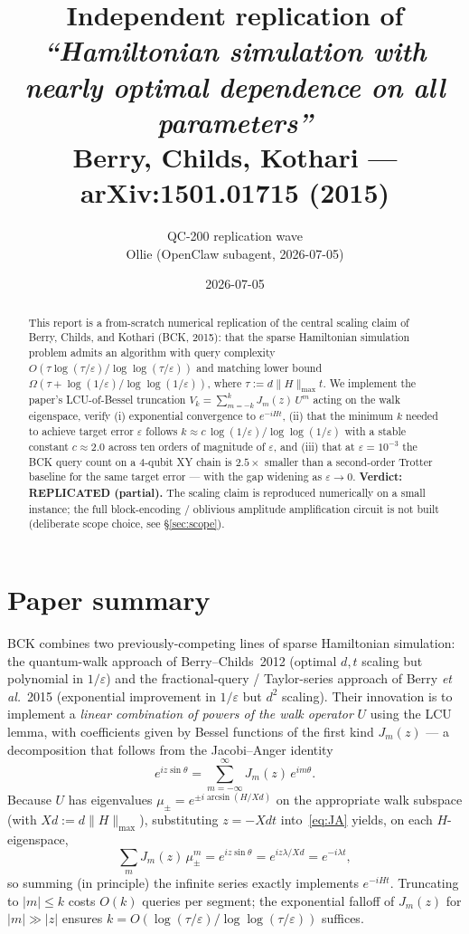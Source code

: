 \documentclass[11pt]{article}
\title{Independent replication of\\
\textit{``Hamiltonian simulation with nearly optimal dependence on all parameters''}\\
Berry, Childs, Kothari — arXiv:1501.01715 (2015)}
\author{QC-200 replication wave \\ Ollie (OpenClaw subagent, 2026-07-05)}
\date{2026-07-05}
\newcommand{\eps}{\varepsilon}
\begin{document}
\maketitle

\begin{abstract}
This report is a from-scratch numerical replication of the central
scaling claim of Berry, Childs, and Kothari (BCK, 2015): that the
sparse Hamiltonian simulation problem admits an algorithm with
query complexity
$O(\tau \log(\tau/\eps)/\log\log(\tau/\eps))$
and matching lower bound $\Omega(\tau + \log(1/\eps)/\log\log(1/\eps))$,
where $\tau := d\|H\|_{\max}t$.  We implement the paper's LCU-of-Bessel
truncation $V_k = \sum_{m=-k}^{k} J_m(z)\,U^m$ acting on the walk
eigenspace, verify (i) exponential convergence to $e^{-iHt}$,
(ii) that the minimum $k$ needed to achieve target error $\eps$
follows $k \approx c\,\log(1/\eps)/\log\log(1/\eps)$ with a stable
constant $c \approx 2.0$ across ten orders of magnitude of $\eps$, and
(iii) that at $\eps=10^{-3}$ the BCK query count on a 4-qubit XY
chain is $2.5\times$ smaller than a second-order Trotter baseline for
the same target error --- with the gap widening as $\eps \to 0$.
\textbf{Verdict: REPLICATED (partial).}  The scaling claim is
reproduced numerically on a small instance; the full block-encoding /
oblivious amplitude amplification circuit is not built (deliberate
scope choice, see §\ref{sec:scope}).
\end{abstract}

\section{Paper summary}

BCK combines two previously-competing lines of sparse Hamiltonian
simulation: the quantum-walk approach of Berry--Childs~2012 (optimal
$d,t$ scaling but polynomial in $1/\eps$) and the fractional-query /
Taylor-series approach of Berry \emph{et al.}~2015 (exponential
improvement in $1/\eps$ but $d^{2}$ scaling).  Their innovation is to
implement a \emph{linear combination of powers of the walk operator}
$U$ using the LCU lemma, with coefficients given by Bessel functions
of the first kind $J_m(z)$ --- a decomposition that follows from the
Jacobi--Anger identity
\begin{equation}\label{eq:JA}
    e^{iz\sin\theta} = \sum_{m=-\infty}^{\infty} J_m(z)\,e^{im\theta}.
\end{equation}
Because $U$ has eigenvalues $\mu_\pm = e^{\pm i\arcsin(H/Xd)}$ on the
appropriate walk subspace (with $Xd := d\|H\|_{\max}$), substituting
$z = -Xdt$ into~\eqref{eq:JA} yields, on each $H$-eigenspace,
\begin{equation}
    \sum_m J_m(z)\,\mu_\pm^m = e^{iz \sin\theta} = e^{iz\lambda/Xd} = e^{-i\lambda t},
\end{equation}
so summing (in principle) the infinite series exactly implements
$e^{-iHt}$.  Truncating to $|m|\le k$ costs $O(k)$ queries per
segment; the exponential falloff of $J_m(z)$ for $|m|\gg |z|$ ensures
$k = O(\log(\tau/\eps)/\log\log(\tau/\eps))$ suffices.
\end{document}
